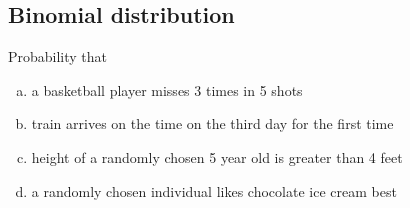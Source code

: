 \documentclass[11pt,containsverbatim,handout,xcolor=xelatex,dvipsnames,table]{beamer}
\newcommand{\solnMult}[1]{#1}
\newcommand{\soln}[1]{}
\begin{document}

\subsection{Binomial distribution}


\begin{frame}


Probability that
\begin{enumerate}[(a)]
\item \solnMult{a basketball player misses 3 times in 5 shots} \soln{\only<2>{{\red{$\rightarrow$ k successes in n trials}}}}
\item train arrives on the time on the third day for the first time
\item height of a randomly chosen 5 year old is greater than 4 feet
\item a randomly chosen individual likes chocolate ice cream best
\end{enumerate}

\end{frame}

\end{document}
